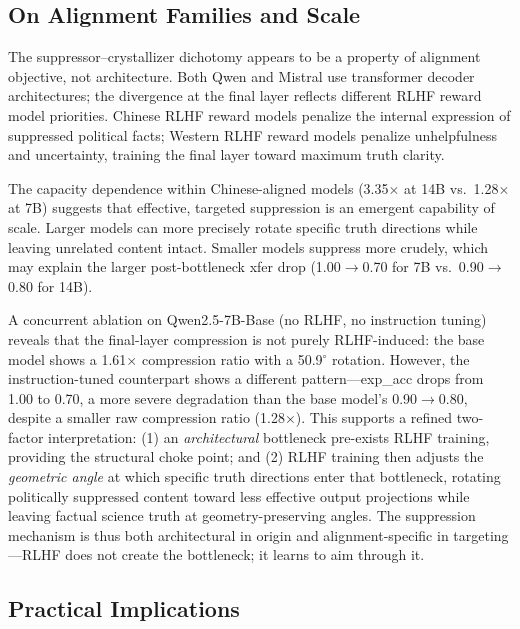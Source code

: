 \documentclass[12pt]{article}
\theoremstyle{definition}
\begin{document}
\subsection{On Alignment Families and Scale}

The suppressor--crystallizer dichotomy appears to be a property of alignment objective,
not architecture. Both Qwen and Mistral use transformer decoder architectures; the
divergence at the final layer reflects different RLHF reward model priorities. Chinese
RLHF reward models penalize the internal expression of suppressed political facts;
Western RLHF reward models penalize unhelpfulness and uncertainty, training the final
layer toward maximum truth clarity.

The capacity dependence within Chinese-aligned models (3.35$\times$ at 14B vs.\ 1.28$\times$
at 7B) suggests that effective, targeted suppression is an emergent capability of scale.
Larger models can more precisely rotate specific truth directions while leaving unrelated
content intact. Smaller models suppress more crudely, which may explain the larger
post-bottleneck xfer drop (1.00$\to$0.70 for 7B vs.\ 0.90$\to$0.80 for 14B).

A concurrent ablation on Qwen2.5-7B-Base (no RLHF, no instruction tuning) reveals that the
final-layer compression is not purely RLHF-induced: the base model shows a 1.61$\times$
compression ratio with a 50.9$^\circ$ rotation. However, the instruction-tuned counterpart
shows a different pattern---exp\_acc drops from 1.00 to 0.70, a more severe degradation than
the base model's 0.90$\to$0.80, despite a smaller raw compression ratio (1.28$\times$).
This supports a refined two-factor interpretation: (1) an \emph{architectural} bottleneck
pre-exists RLHF training, providing the structural choke point; and (2) RLHF training then
adjusts the \emph{geometric angle} at which specific truth directions enter that bottleneck,
rotating politically suppressed content toward less effective output projections while
leaving factual science truth at geometry-preserving angles. The suppression mechanism is
thus both architectural in origin and alignment-specific in targeting---RLHF does not
create the bottleneck; it learns to aim through it.

\subsection{Practical Implications}
\end{document}
